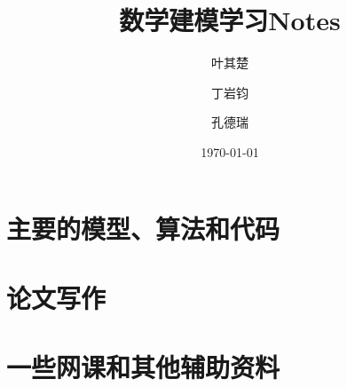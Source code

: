 \documentclass[11pt,a4paper]{article}
\title{数学建模学习Notes}
\author{叶其楚}
\author{丁岩钧}
\author{孔德瑞}
\date{\today}
\begin{document}
\newpage
\section{主要的模型、算法和代码}

\newpage
\section{论文写作}

\newpage
\section{一些网课和其他辅助资料}
\end{document}
